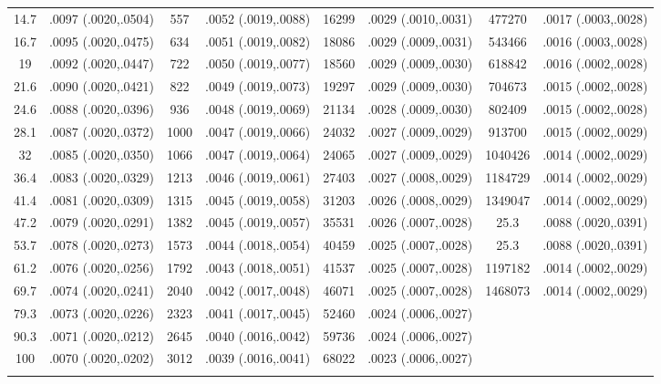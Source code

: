 \begin{longtable}{cccccccc}
  14.7 & .0097 (.0020,.0504) & 557 & .0052 (.0019,.0088) & 16299 & .0029 (.0010,.0031) & 477270 & .0017 (.0003,.0028) \\ 
  16.7 & .0095 (.0020,.0475) & 634 & .0051 (.0019,.0082) & 18086 & .0029 (.0009,.0031) & 543466 & .0016 (.0003,.0028) \\ 
  19 & .0092 (.0020,.0447) & 722 & .0050 (.0019,.0077) & 18560 & .0029 (.0009,.0030) & 618842 & .0016 (.0002,.0028) \\ 
  21.6 & .0090 (.0020,.0421) & 822 & .0049 (.0019,.0073) & 19297 & .0029 (.0009,.0030) & 704673 & .0015 (.0002,.0028) \\ 
  24.6 & .0088 (.0020,.0396) & 936 & .0048 (.0019,.0069) & 21134 & .0028 (.0009,.0030) & 802409 & .0015 (.0002,.0028) \\ 
  28.1 & .0087 (.0020,.0372) & 1000 & .0047 (.0019,.0066) & 24032 & .0027 (.0009,.0029) & 913700 & .0015 (.0002,.0029) \\ 
  32 & .0085 (.0020,.0350) & 1066 & .0047 (.0019,.0064) & 24065 & .0027 (.0009,.0029) & 1040426 & .0014 (.0002,.0029) \\ 
  36.4 & .0083 (.0020,.0329) & 1213 & .0046 (.0019,.0061) & 27403 & .0027 (.0008,.0029) & 1184729 & .0014 (.0002,.0029) \\ 
  41.4 & .0081 (.0020,.0309) & 1315 & .0045 (.0019,.0058) & 31203 & .0026 (.0008,.0029) & 1349047 & .0014 (.0002,.0029) \\ 
  47.2 & .0079 (.0020,.0291) & 1382 & .0045 (.0019,.0057) & 35531 & .0026 (.0007,.0028) & 25.3 & .0088 (.0020,.0391) \\ 
  53.7 & .0078 (.0020,.0273) & 1573 & .0044 (.0018,.0054) & 40459 & .0025 (.0007,.0028) & 25.3 & .0088 (.0020,.0391) \\ 
  61.2 & .0076 (.0020,.0256) & 1792 & .0043 (.0018,.0051) & 41537 & .0025 (.0007,.0028) & 1197182 & .0014 (.0002,.0029) \\ 
  69.7 & .0074 (.0020,.0241) & 2040 & .0042 (.0017,.0048) & 46071 & .0025 (.0007,.0028) & 1468073 & .0014 (.0002,.0029) \\ 
  79.3 & .0073 (.0020,.0226) & 2323 & .0041 (.0017,.0045) & 52460 & .0024 (.0006,.0027) &  &  \\ 
  90.3 & .0071 (.0020,.0212) & 2645 & .0040 (.0016,.0042) & 59736 & .0024 (.0006,.0027) &  &  \\ 
  100 & .0070 (.0020,.0202) & 3012 & .0039 (.0016,.0041) & 68022 & .0023 (.0006,.0027) &  &  \\ 
   \hline
\hline
\label{tab marginalized_risks_eq 1}
\end{longtable}
